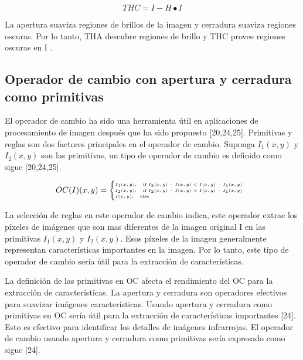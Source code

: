 \documentclass[a4paper, 11 pt, conference]{ieeeconf}      %
\begin{document}
$$
THC = I - H \bullet I
$$

La apertura suaviza regiones de brillos de la imagen y cerradura suaviza regiones oscuras. Por lo tanto, THA descubre regiones de brillo y THC provee regiones oscuras en I \cite{11}.

\subsection{Operador de cambio con apertura y cerradura como primitivas}

El operador de cambio ha sido una herramienta \'util en aplicaciones de procesamiento de imagen despu\'es que ha sido propuesto [20,24,25]. Primitivas y reglas son dos factores principales en el operador de cambio. Suponga $ I_1(x,y) $ y $ I_2(x,y) $ son las primitivas, un tipo de operador de cambio es definido como sigue [20,24,25].

\begin{equation} \label{exp:exp1}
\begin{tiny}
\centering
OC(I)(x,y) = 
    \begin{cases}
     I_1(x,y), \quad \text{if }   I_2(x,y)-I(x,y) < I(x,y)-I_1(x,y) \\ 
     I_2(x,y), \quad \text{if }  I_2(x,y)-I(x,y) > I(x,y)-I_1(x,y)  \\
    I(x,y), \quad \text{else }
    \end{cases}
\end{tiny}
\end{equation}

\normalsize
La selecci\'on de reglas en este operador de cambio indica, este operador extrae los p\'ixeles de im\'agenes que son mas diferentes de la imagen original I en las primitivas $ I_1(x,y) $ y $ I_2(x,y) $. Esos p\'ixeles de la imagen generalmente representan caracter\'isticas importantes en la imagen. Por lo tanto, este tipo de operador de cambio ser\'ia \'util para la extracci\'on de caracter\'isticas.

La definici\'on de las primitivas en OC afecta el rendimiento del OC para la extracci\'on de caracter\'isticas. La apertura y cerradura son operadores efectivos para suavizar im\'agenes caracter\'isticas. Usando apertura y cerradura como primitivas en OC ser\'ia \'util para la extracci\'on de caracter\'isticas importantes [24]. Esto es efectivo para identificar los detalles de im\'agenes infrarrojas. El operador de cambio usando apertura y cerradura como primitivas ser\'ia expresado como sigue [24].
\end{document}

